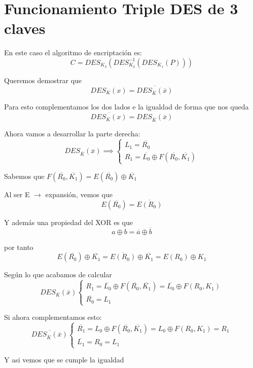  \section{Funcionamiento Triple DES de 3 claves}
 
 En este caso el algoritmo de encriptación es:
 $$C = DES_{K_3}(DES^{-1}_{K_2}(DES_{K_1}(P )))$$
 
 \begin{example}
 	Queremos demostrar que 
 	$$DES_K(x) = \overline{DES_{\overline{K}}(\overline{x})}$$
 	
 	Para esto complementamos los dos lados e la igualdad de forma que nos queda
 	$$\overline{DES_K(x)} = DES_{\overline{K}}(\overline{x})$$
 	
 	Ahora vamos a desarrollar la parte derecha:
 	$$DES_{\overline{K}}(\overline{x}) \implies \begin{cases}
		L_1 = \overline{R_0}\\
		R_1 = \overline{L_0} \oplus F(\overline{R_0} , \overline{K_1})
 	\end{cases}$$
 	
 	Sabemos que $F(\overline{R_0} , \overline{K_1}) = E(\overline{R_0}) \oplus \overline{K_1}$
 	
 	Al ser E $\rightarrow$ expansión, vemos que 
 	$$E(\overline{R_0}) = \overline{E(R_0)}$$
 	
 	Y además una propiedad del XOR es que
 	$$a\oplus b = \overline{a} \oplus \overline{b}$$
 	
 	por tanto
 	$$E(\overline{R_0}) \oplus \overline{K_1} = \overline{E(R_0)} \oplus \overline{K_1} = E(R_0) \oplus K_1$$
 	
 	Según lo que acabamos de calcular
 	$$DES_{\overline{K}}(\overline{x})\begin{cases}
	 	R_1 = \overline{L_0} \oplus F(\overline{R_0} , \overline{K_1}) = \overline{L_0} \oplus F(R_0 , K_1)\\
	 	\overline{R_0} = L_1
 	\end{cases}$$
 	
 	Si ahora complementamos esto:
 	$$\overline{DES_{\overline{K}}(\overline{x})}\begin{cases}
 	\overline{R_1} = L_0 \oplus F(\overline{R_0} , \overline{K_1}) = L_0 \oplus F(R_0 , K_1) = R_1\\
 	\overline{L_1} = R_0 = L_1
 	\end{cases}$$
 	
	Y asi vemos que se cumple la igualdad 	
 \end{example}
 \newpage
